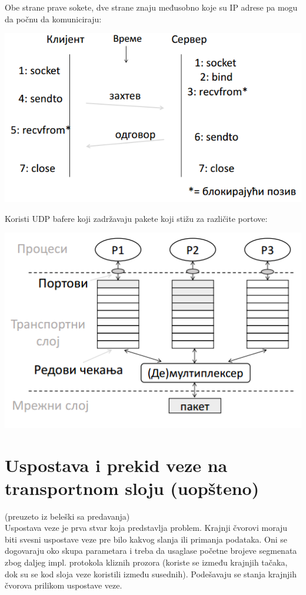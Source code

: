 \documentclass{article} %
\begin{document}
Obe strane prave sokete, dve strane znaju međusobno koje su IP adrese pa mogu da počnu da komuniciraju:
\begin{center}
	\includegraphics[scale=0.5]{udp2}
\end{center}

Koristi UDP bafere koji zadržavaju pakete koji stižu za različite portove:
\begin{center}
	\includegraphics[scale=0.5]{udp3}
\end{center}
\section{Uspostava i prekid veze na transportnom sloju (uopšteno)}
(preuzeto iz beleški sa predavanja)\\

Uspostava veze je prva stvar koja predstavlja problem. Krajnji čvorovi moraju biti svesni uspostave veze pre bilo kakvog slanja ili primanja podataka. Oni se dogovaraju oko skupa parametara i treba da usaglase početne brojeve segmenata zbog daljeg impl. protokola kliznih prozora (koriste se između krajnjih tačaka, dok su se kod sloja veze koristili između susednih). Podešavaju se stanja krajnjih čvorova prilikom uspostave veze.\\
\end{document}
